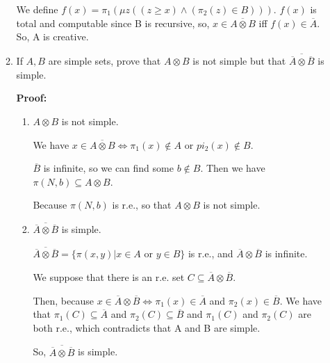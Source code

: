 \documentclass[12pt,a4paper]{article}
\theoremstyle{definition}
\numberwithin{equation}{section}
\numberwithin{figure}{section}
\begin{document}
\begin{enumerate}
\begin{enumerate}
  We define $f(x) = \pi_1(\mu z((z \geq x) \wedge (\pi_2(z) \in B)))$. $f(x)$ is total and computable since B is recursive, so, $x \in \overline{A \otimes B}$ iff $f(x) \in \overline{A}$. So, A is creative.
  
  \item If $A,B$ are simple sets, prove that $A \otimes B$ is not simple but that $\overline{\overline{A}\otimes \overline{B}}$ is simple.
  
  \textbf{Proof:}
  
\begin{enumerate}

\item $A \otimes B$ is not simple.

We have $x \in \overline{A \otimes B} \Leftrightarrow \pi_1(x) \notin A$ or $pi_2(x) \notin B$.

$\overline{B}$ is infinite, so we can find some $b \notin B$. Then we have $\pi(N, b) \subseteq A \otimes B$.

Because $\pi(N, b)$ is r.e., so that $A \otimes B$ is not simple.

\item $\overline{\overline{A}\otimes \overline{B}}$ is simple.

$\overline{\overline{A}\otimes \overline{B}} = \{\pi(x, y) | x \in A \mbox{ or } y \in B\}$ is r.e., and $\overline{A}\otimes \overline{B}$ is infinite.

We suppose that there is an r.e. set $C \subseteq \overline{A}\otimes \overline{B}$. 

Then, because $x \in \overline{A} \otimes \overline{B} \Leftrightarrow \pi_1(x) \in \overline{A}$ and $\pi_2(x) \in \overline{B}$. We have that $ \pi_1(C) \subseteq \overline{A}$ and $ \pi_2(C) \subseteq \overline{B}$ and $\pi_1(C)$ and $\pi_2(C)$ are both r.e., which contradicts that A and B are simple.

So, $\overline{\overline{A}\otimes \overline{B}}$ is simple.
  
\end{enumerate}
\end{enumerate}
\end{enumerate}
\end{document}
